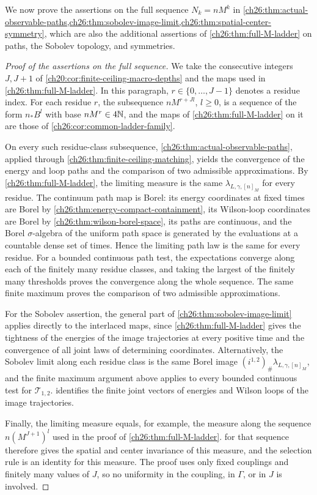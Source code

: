 We now prove the assertions on the full sequence $N_k=nM^k$ in \cref{ch26:thm:actual-observable-paths,ch26:thm:sobolev-image-limit,ch26:thm:spatial-center-symmetry}, which are also the additional assertions of \cref{ch26:thm:full-M-ladder} on paths, the Sobolev topology, and symmetries.

\begin{proof}[Proof of the assertions on the full sequence]
We take the consecutive integers $J,J+1$ of \cref{ch20:cor:finite-ceiling-macro-depths} and the maps used in \cref{ch26:thm:full-M-ladder}. In this paragraph, $r\in\{0,\dots,J-1\}$ denotes a residue index. For each residue $r$, the subsequence $nM^{r+Jl}$, $l\ge0$, is a sequence of the form $n_*B^l$ with base $nM^r\in4\mathbb N$, and the maps of \cref{ch26:thm:full-M-ladder} on it are those of \cref{ch26:cor:common-ladder-family}.

On every such residue-class subsequence, \cref{ch26:thm:actual-observable-paths}, applied through \cref{ch26:thm:finite-ceiling-matching}, yields the convergence of the energy and loop paths and the comparison of two admissible approximations. By \cref{ch26:thm:full-M-ladder}, the limiting measure is the same $\lambda_{L,\gamma,[n]_M}$ for every residue. The continuum path map is Borel: its energy coordinates at fixed times are Borel by \cref{ch26:thm:energy-compact-containment}, its Wilson-loop coordinates are Borel by \cref{ch26:thm:wilson-borel-space}, its paths are continuous, and the Borel $\sigma$-algebra of the uniform path space is generated by the evaluations at a countable dense set of times. Hence the limiting path law is the same for every residue. For a bounded continuous path test, the expectations converge along each of the finitely many residue classes, and taking the largest of the finitely many thresholds proves the convergence along the whole sequence. The same finite maximum proves the comparison of two admissible approximations.

For the Sobolev assertion, the general part of \cref{ch26:thm:sobolev-image-limit} applies directly to the interlaced maps, since \cref{ch26:thm:full-M-ladder} gives the tightness of the energies of the image trajectories at every positive time and the convergence of all joint laws of determining coordinates. Alternatively, the Sobolev limit along each residue class is the same Borel image $(i^{1,2})_\#\lambda_{L,\gamma,[n]_M}$, and the finite maximum argument above applies to every bounded continuous test for $\mathcal T_{1,2}$.  identifies the finite joint vectors of energies and Wilson loops of the image trajectories.

Finally, the limiting measure equals, for example, the measure along the sequence $n(M^{J+1})^l$ used in the proof of \cref{ch26:thm:full-M-ladder}.  for that sequence therefore gives the spatial and center invariance of this measure, and the selection rule is an identity for this measure. The proof uses only fixed couplings and finitely many values of $J$, so no uniformity in the coupling, in $\Gamma$, or in $J$ is involved.
\end{proof}

